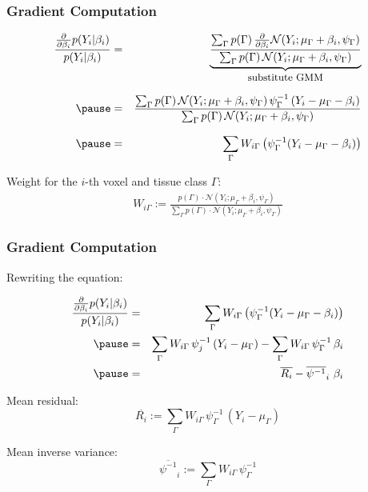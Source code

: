 \begin{frame}
  \frametitle{Gradient Computation \cont}

  {\footnotesize
  \begin{eqnarray*}
    \frac{\frac{\partial}{\partial \beta_i} p(Y_i | \beta_i)}{p(Y_i | \beta_i)} 
    &=& \underbrace{
          \frac{\sum_{\Gamma} p(\Gamma) \, \frac{\partial}{\partial \beta_i} {\mathcal N}(Y_i ; \mu_\Gamma + \beta_i, \psi_{\Gamma}) }
               {\sum_{\Gamma} p(\Gamma) \, {\mathcal N}(Y_i ; \mu_\Gamma + \beta_i, \psi_\Gamma)}
        }_{\mbox{\small substitute GMM}} \\[.25cm] \pause
    &=& \frac{\sum_{\Gamma} p(\Gamma) \, {\mathcal N}(Y_i ; \mu_\Gamma + \beta_i, \psi_\Gamma) \, \psi_\Gamma^{-1} \, (Y_i - \mu_\Gamma - \beta_i)}
             {\sum_\Gamma p(\Gamma) \, {\mathcal N}(Y_i ; \mu_\Gamma + \beta_i, \psi_\Gamma) } \\[.25cm] \pause 
    &=& \sum_\Gamma W_{i\Gamma} \left( \psi_\Gamma^{-1} (Y_i - \mu_\Gamma - \beta_i) \right)
  \end{eqnarray*}
  }

  Weight for the $i$-th voxel and tissue class $\Gamma$:
  {\footnotesize
  \begin{eqnarray*}
    W_{i\Gamma} := 
      \frac{p(\Gamma) \cdot \mathcal{N}(Y_i ; \mu_\Gamma + \beta_i, \psi_\Gamma) }
           {\sum_{\Gamma} p(\Gamma) \cdot \mathcal{N}(Y_i ; \mu_\Gamma + \beta_i, \psi_\Gamma)} 
  \end{eqnarray*}
  }
\end{frame}


\begin{frame}
  \frametitle{Gradient Computation \cont}

  Rewriting the equation:

  {\footnotesize
  \begin{eqnarray*}
    \frac{\frac{\partial}{\partial \beta_i} p(Y_i | \beta_i)}
         {p(Y_i | \beta_i)} 
    &=& \sum_\Gamma W_{i\Gamma} \left( \psi_\Gamma^{-1} (Y_i - \mu_\Gamma - \beta_i) \right) \\ \pause 
    &=& \sum_\Gamma W_{i\Gamma} \, \psi_j^{-1} \, (Y_i - \mu_\Gamma) - \sum_\Gamma W_{i\Gamma} \, \psi_\Gamma^{-1} \, \beta_i \\ \pause 
    &=& \overline{R_i} - \overline{\psi^{-1}}_i ~\beta_i
  \end{eqnarray*}
  }
  
  Mean residual:
  {\footnotesize
  \begin{displaymath}
    \overline{R_i} := \sum_\Gamma W_{i\Gamma} \, \psi_\Gamma^{-1} \, (Y_i - \mu_\Gamma)
  \end{displaymath}
  }
  
  Mean inverse variance:
  {\footnotesize
  \begin{displaymath}
    \overline{\psi^{-1}}_i := \sum_\Gamma W_{i\Gamma} \, \psi_\Gamma^{-1}
  \end{displaymath}
  }
\end{frame}



